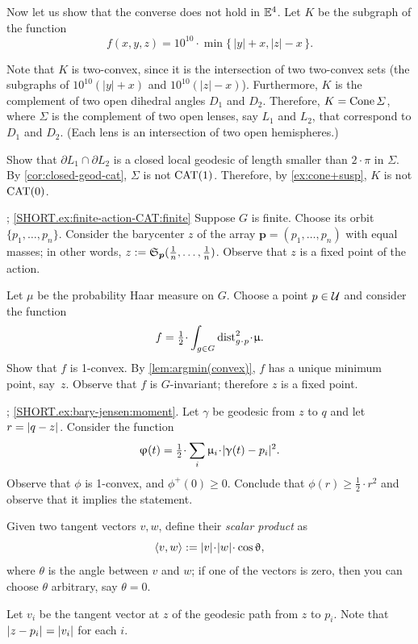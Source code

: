 Now let us show that the converse does not hold in $\mathbb{E}^4$.
Let $K$ be the subgraph of the function
\[f(x,y,z)=10^{10}\cdot \min\{\,|y|+x,|z|-x\,\}.\]

Note that $K$ is two-convex, since it is the intersection of two two-convex sets (the subgraphs of $10^{10}(|y|+x)$ and $10^{10}(|z|-x)$).
Furthermore, $K$ is the complement of two open dihedral angles $D_1$ and $D_2$.
Therefore, $K=\mathop{\rm Cone}\nolimits\varSigma$, where $\Sigma$
is the complement of two open lenses, say $L_1$ and $L_2$, that correspond to $D_1$ and $D_2$.
(Each lens is an intersection of two open hemispheres.)

Show that $\partial L_1\cap\partial L_2$ is a closed local geodesic of length smaller than $2\cdot\pi$ in $\Sigma$.
By \ref{cor:closed-geod-cat}, $\Sigma$ is not $\mathrm{CAT}(1)$.
Therefore, by \ref{ex:cone+susp}, $K$ is not $\mathrm{CAT}(0)$.


\parbf{\ref{ex:finite-action-CAT}}; \ref{SHORT.ex:finite-action-CAT:finite}
Suppose $G$ is finite.
Choose its orbit $\{p_1,\ldots,p_n\}$.
Consider the barycenter $z$ of the array $\bm{p}=(p_1,\ldots,p_n)$ with equal masses;
in other words, $z\mathrel{:=}\mathfrak{S}_{\bm{p}}(\tfrac1n,\ldots,\tfrac1n)$.
Observe that $z$ is a fixed point of the action.

Let $\mu$ be the probability Haar measure on $G$.
Choose a point $p\in \spc{U}$ and consider the function
\[f=\tfrac12\cdot\int_{g\in G} \distfun_{g\cdot p}^2\cdot\mu.\]
Show that $f$ is 1-convex.
By \ref{lem:argmin(convex)}, $f$ has a unique minimum point, say~$z$.
Observe that $f$ is $G$-invariant;
therefore $z$ is a fixed point.



\parbf{\ref{ex:bary-jensen}}; \ref{SHORT.ex:bary-jensen:moment}.
Let $\gamma$ be geodesic from $z$ to $q$ and let $r=\dist{q}{z}{}$.
Consider the function
\[\phi(t)=\tfrac12\cdot \sum_i \mu_i\cdot \dist[2]{\gamma(t)}{p_i}{}.\]
Observe that $\phi$ is 1-convex, and $\phi^+(0)\ge 0$.
Conclude that
$\phi(r)\ge \tfrac12\cdot r^2$
and observe that it implies the statement.

Given two tangent vectors $v,w$, define their \emph{scalar product} as
\[\langle v,w\rangle\df|v|\cdot |w|\cdot\cos\theta,\]
where $\theta$ is the angle between $v$ and $w$;
if one of the vectors is zero, then you can choose $\theta$ arbitrary, say $\theta=0$.

Let $v_i$ be the tangent vector at $z$ of the geodesic path from $z$ to $p_i$.
Note that $\dist{z}{p_i}{}=|v_i|$ for each $i$.

